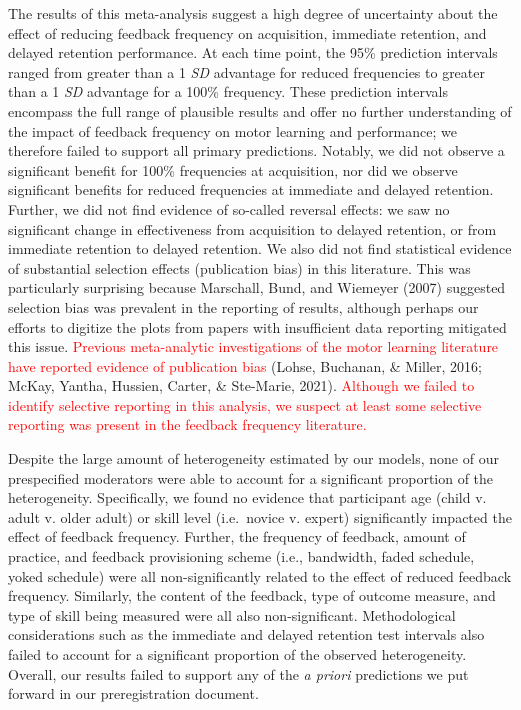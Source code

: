 \documentclass[
  english,
  man, donotrepeattitle,mask,floatsintext]{apa7}
\begin{document}
The results of this meta-analysis suggest a high degree of uncertainty about the effect of reducing feedback frequency on acquisition, immediate retention, and delayed retention performance. At each time point, the 95\% prediction intervals ranged from greater than a 1 \emph{SD} advantage for reduced frequencies to greater than a 1 \emph{SD} advantage for a 100\% frequency. These prediction intervals encompass the full range of plausible results and offer no further understanding of the impact of feedback frequency on motor learning and performance; we therefore failed to support all primary predictions. Notably, we did not observe a significant benefit for 100\% frequencies at acquisition, nor did we observe significant benefits for reduced frequencies at immediate and delayed retention. Further, we did not find evidence of so-called reversal effects: we saw no significant change in effectiveness from acquisition to delayed retention, or from immediate retention to delayed retention. We also did not find statistical evidence of substantial selection effects (publication bias) in this literature. This was particularly surprising because Marschall, Bund, and Wiemeyer (2007) suggested selection bias was prevalent in the reporting of results, although perhaps our efforts to digitize the plots from papers with insufficient data reporting mitigated this issue. \textcolor{red}{Previous meta-analytic investigations of the motor learning literature have reported evidence of publication bias} (Lohse, Buchanan, \& Miller, 2016; McKay, Yantha, Hussien, Carter, \& Ste-Marie, 2021). \textcolor{red}{Although we failed to identify selective reporting in this analysis, we suspect at least some selective reporting was present in the feedback frequency literature.}

Despite the large amount of heterogeneity estimated by our models, none of our prespecified moderators were able to account for a significant proportion of the heterogeneity. Specifically, we found no evidence that participant age (child v. adult v. older adult) or skill level (i.e.~novice v. expert) significantly impacted the effect of feedback frequency. Further, the frequency of feedback, amount of practice, and feedback provisioning scheme (i.e., bandwidth, faded schedule, yoked schedule) were all non-significantly related to the effect of reduced feedback frequency. Similarly, the content of the feedback, type of outcome measure, and type of skill being measured were all also non-significant. Methodological considerations such as the immediate and delayed retention test intervals also failed to account for a significant proportion of the observed heterogeneity. Overall, our results failed to support any of the \emph{a priori} predictions we put forward in our preregistration document.
\end{document}
